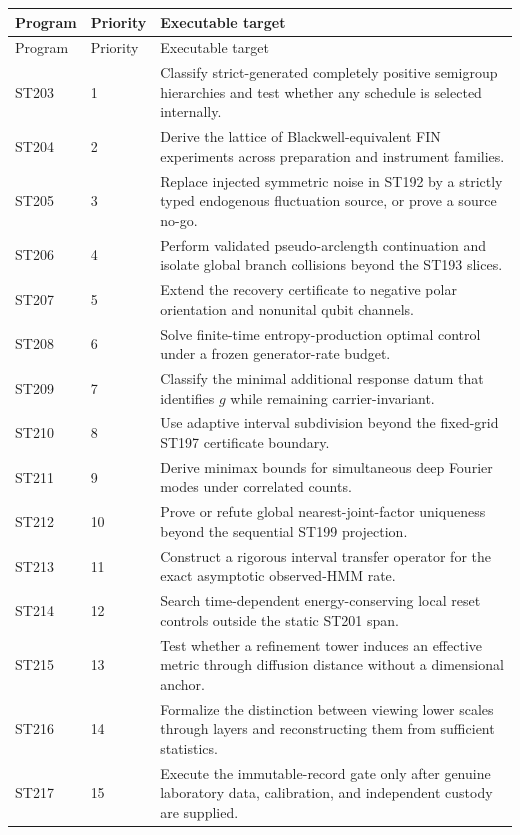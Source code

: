 \documentclass[11pt,a4paper]{article}
\begin{document}
\begin{longtable}{@{}p{}p{}p{}@{}}
\toprule Program & Priority & Executable target\\\midrule\endfirsthead
\toprule Program & Priority & Executable target\\\midrule\endhead
ST203 & 1 & Classify strict-generated completely positive semigroup hierarchies and test whether any schedule is selected internally.\\
ST204 & 2 & Derive the lattice of Blackwell-equivalent FIN experiments across preparation and instrument families.\\
ST205 & 3 & Replace injected symmetric noise in ST192 by a strictly typed endogenous fluctuation source, or prove a source no-go.\\
ST206 & 4 & Perform validated pseudo-arclength continuation and isolate global branch collisions beyond the ST193 slices.\\
ST207 & 5 & Extend the recovery certificate to negative polar orientation and nonunital qubit channels.\\
ST208 & 6 & Solve finite-time entropy-production optimal control under a frozen generator-rate budget.\\
ST209 & 7 & Classify the minimal additional response datum that identifies $g$ while remaining carrier-invariant.\\
ST210 & 8 & Use adaptive interval subdivision beyond the fixed-grid ST197 certificate boundary.\\
ST211 & 9 & Derive minimax bounds for simultaneous deep Fourier modes under correlated counts.\\
ST212 & 10 & Prove or refute global nearest-joint-factor uniqueness beyond the sequential ST199 projection.\\
ST213 & 11 & Construct a rigorous interval transfer operator for the exact asymptotic observed-HMM rate.\\
ST214 & 12 & Search time-dependent energy-conserving local reset controls outside the static ST201 span.\\
ST215 & 13 & Test whether a refinement tower induces an effective metric through diffusion distance without a dimensional anchor.\\
ST216 & 14 & Formalize the distinction between viewing lower scales through layers and reconstructing them from sufficient statistics.\\
ST217 & 15 & Execute the immutable-record gate only after genuine laboratory data, calibration, and independent custody are supplied.\\
\bottomrule
\end{longtable}
\end{document}
